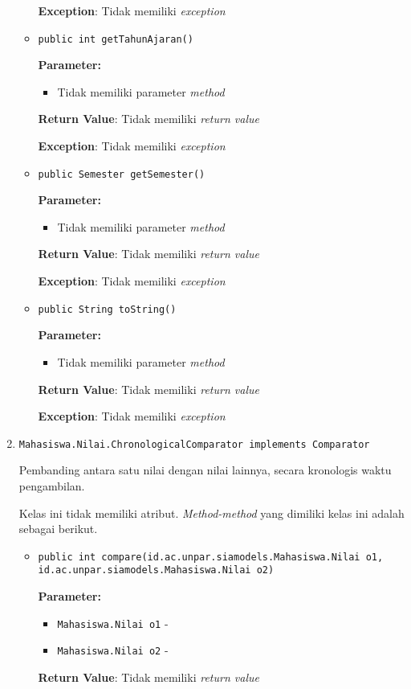 \documentclass{article}
\begin{document}
\begin{enumerate}
\begin{itemize}
\textbf{Exception}: Tidak memiliki \textit{exception}

\item \texttt{public int getTahunAjaran()}

\textbf{Parameter:}
\begin{itemize}
\item Tidak memiliki parameter \textit{method}
\end{itemize}
\textbf{Return Value}: Tidak memiliki \textit{return value}

\textbf{Exception}: Tidak memiliki \textit{exception}

\item \texttt{public Semester getSemester()}

\textbf{Parameter:}
\begin{itemize}
\item Tidak memiliki parameter \textit{method}
\end{itemize}
\textbf{Return Value}: Tidak memiliki \textit{return value}

\textbf{Exception}: Tidak memiliki \textit{exception}

\item \texttt{public String toString()}

\textbf{Parameter:}
\begin{itemize}
\item Tidak memiliki parameter \textit{method}
\end{itemize}
\textbf{Return Value}: Tidak memiliki \textit{return value}

\textbf{Exception}: Tidak memiliki \textit{exception}

\end{itemize}
\item \texttt{Mahasiswa.Nilai.ChronologicalComparator implements Comparator}

Pembanding antara satu nilai dengan nilai lainnya, secara
 kronologis waktu pengambilan.

Kelas ini tidak memiliki atribut. \textit{Method-method} yang dimiliki kelas ini adalah sebagai berikut.
\begin{itemize}
\item \texttt{public int compare(id.ac.unpar.siamodels.Mahasiswa.Nilai o1, id.ac.unpar.siamodels.Mahasiswa.Nilai o2)}

\textbf{Parameter:}
\begin{itemize}
\item \texttt{Mahasiswa.Nilai o1} - 
\item \texttt{Mahasiswa.Nilai o2} - 
\end{itemize}
\textbf{Return Value}: Tidak memiliki \textit{return value}


\end{itemize}
\end{enumerate}
\end{document}
